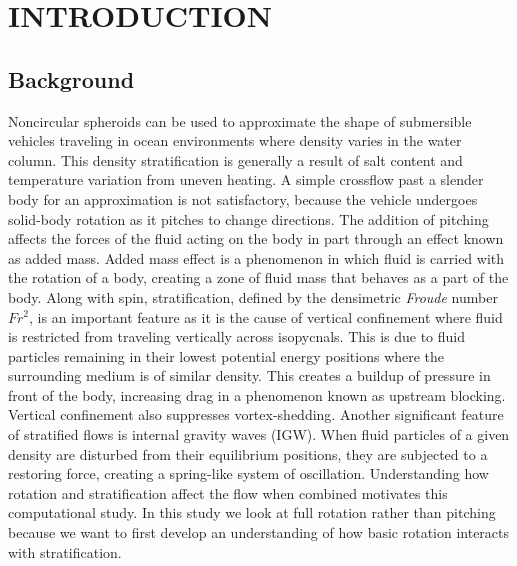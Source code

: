 %
%
%
%

\chapter{INTRODUCTION}
\thispagestyle{empty}

\section{Background}
Noncircular spheroids can be used to approximate the shape of submersible vehicles traveling in ocean environments where density varies in the water column. This density stratification is generally a result of salt content and temperature variation from uneven heating. A simple crossflow past a slender body for an approximation is not satisfactory, because the vehicle undergoes solid-body rotation as it pitches to change directions. The addition of pitching affects the forces of the fluid acting on the body in part through an effect known as added mass. Added mass effect is a phenomenon in which fluid is carried with the rotation of a body, creating a zone of fluid mass that behaves as a part of the body. Along with spin, stratification, defined by the densimetric \textit{Froude} number $Fr^2$, is an important feature as it is the cause of vertical confinement where fluid is restricted from traveling vertically across isopycnals. This is due to fluid particles remaining in their lowest potential energy positions where the surrounding medium is of similar density. This creates a buildup of pressure in front of the body, increasing drag in a phenomenon known as upstream blocking. Vertical confinement also suppresses vortex-shedding. Another significant feature of stratified flows is internal gravity waves (IGW). When fluid particles of a given density are disturbed from their equilibrium positions, they are subjected to a restoring force, creating a spring-like system of oscillation. Understanding how rotation and stratification affect the flow when combined motivates this computational study. In this study we look at full rotation rather than pitching because we want to first develop an understanding of how basic rotation interacts with stratification. 

